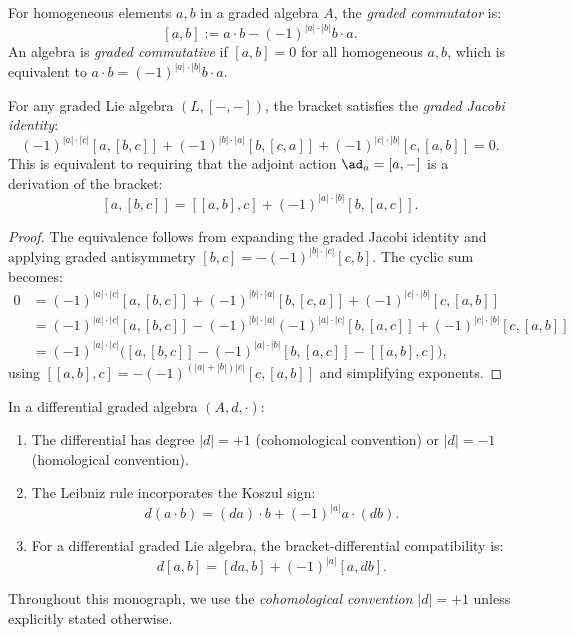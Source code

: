 \begin{definition}
\label{def:graded-commutator}
For homogeneous elements $a, b$ in a graded algebra $A$, the
\emph{graded commutator} is:
\[
[a, b] := a \cdot b - (-1)^{|a| \cdot |b|} b \cdot a.
\]
An algebra is \emph{graded commutative} if $[a, b] = 0$ for all homogeneous
$a, b$, which is equivalent to $a \cdot b = (-1)^{|a| \cdot |b|} b \cdot a$.
\end{definition}

\begin{proposition}
\label{prop:graded-jacobi}
For any graded Lie algebra $(L, [-,-])$, the bracket satisfies the
\emph{graded Jacobi identity}:
\[
(-1)^{|a| \cdot |c|} [a, [b, c]] + (-1)^{|b| \cdot |a|} [b, [c, a]]
+ (-1)^{|c| \cdot |b|} [c, [a, b]] = 0.
\]
This is equivalent to requiring that the adjoint action $\ad_a = [a, -]$
is a derivation of the bracket:
\[
[a, [b, c]] = [[a, b], c] + (-1)^{|a| \cdot |b|} [b, [a, c]].
\]
\end{proposition}

\begin{proof}
The equivalence follows from expanding the graded Jacobi identity and
applying graded antisymmetry $[b, c] = -(-1)^{|b| \cdot |c|} [c, b]$.
The cyclic sum becomes:
\begin{align*}
0 &= (-1)^{|a| \cdot |c|} [a, [b, c]] + (-1)^{|b| \cdot |a|} [b, [c, a]]
 + (-1)^{|c| \cdot |b|} [c, [a, b]] \\
 &= (-1)^{|a| \cdot |c|} [a, [b, c]]
 - (-1)^{|b| \cdot |a|} (-1)^{|a| \cdot |c|} [b, [a, c]]
 + (-1)^{|c| \cdot |b|} [c, [a, b]] \\
 &= (-1)^{|a| \cdot |c|} \bigl( [a, [b, c]] - (-1)^{|a| \cdot |b|} [b, [a, c]]
 - [[a, b], c] \bigr),
\end{align*}
using $[[a,b],c] = -(-1)^{(|a|+|b|)|c|}[c,[a,b]]$ and simplifying exponents.
\end{proof}

\begin{convention}
\label{conv:dg-signs}
In a differential graded algebra $(A, d, \cdot)$:
\begin{enumerate}[label=(\roman*)]
\item The differential has degree $|d| = +1$ (cohomological convention)
or $|d| = -1$ (homological convention).
\item The Leibniz rule incorporates the Koszul sign:
\[
d(a \cdot b) = (da) \cdot b + (-1)^{|a|} a \cdot (db).
\]
\item For a differential graded Lie algebra, the bracket-differential
compatibility is:
\[
d[a, b] = [da, b] + (-1)^{|a|} [a, db].
\]
\end{enumerate}
Throughout this monograph, we use the \emph{cohomological convention}
$|d| = +1$ unless explicitly stated otherwise.
\end{convention}

